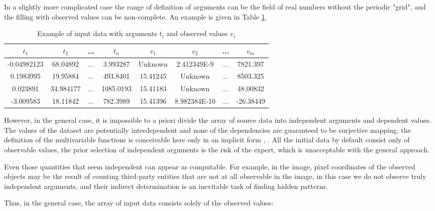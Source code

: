 \documentclass[a4paper, 11pt, oneside]{book}
\begin{document}
In a slightly more complicated case the range of definition of arguments can be the field of real numbers without the periodic "grid", and the filling with observed values can be non-complete. An example is given in Table \ref{table:tivi}.

\begin{table}[h!]
  \centering
  \begin{tabular}{||c c c c c c c c||}
    \hline
    $t_1$ & $t_2$ & ... & $t_n$ & $v_1$ & $v_2$ & ... & $v_m$ \\ [0.5ex] 
    \hline
    -0.04982123 & 68.04892 & ... & 3.993287 & Unknown & 2.412349E-9 & ... & 7821.397 \\ 
    0.1983995 & 19.95884 & ... & 493.8401 & 15.41245 & Unknown & ... & 8503.325 \\
    0.023891 & 34.984177 & ... & 1085.0193 & 15.41183 & Unknown & ... & 48.00832 \\
    -3.009583 & 18.11842 & ... & 782.3989 & 15.41396 & 8.982384E-10 & ... & -26.38449 \\ [1ex] 
    \hline
  \end{tabular}
  \caption{Example of input data with arguments $t_i$ and observed values $v_i$}
  \label{table:tivi}
\end{table}

However, in the general case, it is impossible to a priori divide the array of source data into independent arguments and dependent values. The values of the dataset are potentially interdependent and none of the dependencies are guaranteed to be surjective mapping, the definition of the multivariable functions is conceivable here only in an implicit form \cite{Cauchy_book}\relax, \cite{Ulisse_book}\relax. All the initial data by default consist only of observable values, the prior selection of independent arguments is the risk of the expert, which is unacceptable with the general approach.

Even those quantities that seem independent can appear as computable. For example, in the image, pixel coordinates of the observed objects may be the result of counting third-party entities that are not at all observable in the image, in this case we do not observe truly independent arguments, and their indirect determination is an inevitable task of finding hidden patterns.

Thus, in the general case, the array of input data consists solely of the observed values:
\end{document}
